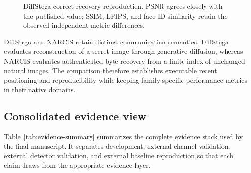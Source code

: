 \begin{figure}[t]
\centering
{}
\caption{DiffStega correct-recovery reproduction. PSNR agrees closely with the published value; SSIM, LPIPS, and face-ID similarity retain the observed independent-metric differences.}
\label{fig:diffstega-reproduction}
\end{figure}

DiffStega and NARCIS retain distinct communication semantics. DiffStega evaluates reconstruction of a secret image through generative diffusion, whereas NARCIS evaluates authenticated byte recovery from a finite index of unchanged natural images. The comparison therefore establishes executable recent positioning and reproducibility while keeping family-specific performance metrics in their native domains.

\subsection{Consolidated evidence view}

Table~\ref{tab:evidence-summary} summarizes the complete evidence stack used by the final manuscript. It separates development, external channel validation, external detector validation, and external baseline reproduction so that each claim draws from the appropriate evidence layer.

